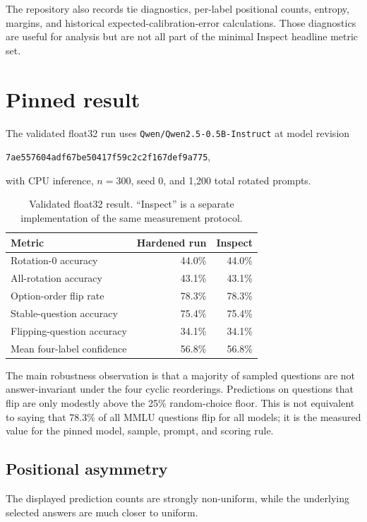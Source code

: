 \documentclass[10pt]{article}
\begin{document}
The repository also records tie diagnostics, per-label positional counts, entropy, margins, and historical expected-calibration-error calculations. Those diagnostics are useful for analysis but are not all part of the minimal Inspect headline metric set.

\section{Pinned result}

The validated float32 run uses \texttt{Qwen/Qwen2.5-0.5B-Instruct} at model revision
\begin{center}
\small\texttt{7ae557604adf67be50417f59c2c2f167def9a775},
\end{center}
with CPU inference, $n=300$, seed 0, and 1,200 total rotated prompts.

\begin{table}[h]
\centering
\caption{Validated float32 result. ``Inspect'' is a separate implementation of the same measurement protocol.}
\label{tab:parity}
\begin{tabular}{lrr}
\toprule
Metric & Hardened run & Inspect \\
\midrule
Rotation-0 accuracy & 44.0\% & 44.0\% \\
All-rotation accuracy & 43.1\% & 43.1\% \\
Option-order flip rate & 78.3\% & 78.3\% \\
Stable-question accuracy & 75.4\% & 75.4\% \\
Flipping-question accuracy & 34.1\% & 34.1\% \\
Mean four-label confidence & 56.8\% & 56.8\% \\
\bottomrule
\end{tabular}
\end{table}

The main robustness observation is that a majority of sampled questions are not answer-invariant under the four cyclic reorderings. Predictions on questions that flip are only modestly above the 25\% random-choice floor. This is not equivalent to saying that 78.3\% of all MMLU questions flip for all models; it is the measured value for the pinned model, sample, prompt, and scoring rule.

\subsection{Positional asymmetry}

The displayed prediction counts are strongly non-uniform, while the underlying selected answers are much closer to uniform.
\end{document}
